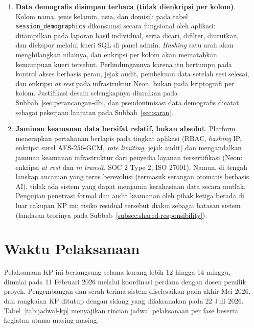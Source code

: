 \begin{enumerate}[leftmargin=2cm]
  \item \textbf{Data demografis disimpan terbaca (tidak dienkripsi per kolom)}. Kolom nama, jenis kelamin, usia, dan domisili pada tabel \texttt{session\_demographics} dikonsumsi secara fungsional oleh aplikasi: ditampilkan pada laporan hasil individual, serta dicari, difilter, diurutkan, dan diekspor melalui kueri SQL di panel admin. \textit{Hashing} satu arah akan menghilangkan nilainya, dan enkripsi per kolom akan mematahkan kemampuan kueri tersebut. Perlindungannya karena itu bertumpu pada kontrol akses berbasis peran, jejak audit, pembekuan data setelah sesi selesai, dan enkripsi \textit{at rest} pada infrastruktur Neon, bukan pada kriptografi per kolom. Justifikasi desain selengkapnya diuraikan pada Subbab~\ref{sec:perancangan-db}, dan pseudonimisasi data demografis dicatat sebagai pekerjaan lanjutan pada Subbab~\ref{sec:saran}.
  \item \textbf{Jaminan keamanan data bersifat relatif, bukan absolut}. Platform menerapkan pertahanan berlapis pada tingkat aplikasi (RBAC, \textit{hashing} IP, enkripsi surel AES-256-GCM, \textit{rate limiting}, jejak audit) dan mengandalkan jaminan keamanan infrastruktur dari penyedia layanan tersertifikasi (Neon: enkripsi \textit{at rest} dan \textit{in transit}, SOC 2 Type 2, ISO 27001). Namun, di tengah lanskap ancaman yang terus berevolusi (termasuk serangan otomatis berbasis AI), tidak ada sistem yang dapat menjamin kerahasiaan data secara mutlak. Pengujian penetrasi formal dan audit keamanan oleh pihak ketiga berada di luar cakupan KP ini; risiko residual tersebut diakui sebagai batasan sistem (landasan teorinya pada Subbab~\ref{subsec:shared-responsibility}).
\end{enumerate}

\section{Waktu Pelaksanaan}
\label{sec:waktu-pelaksanaan}

Pelaksanaan KP ini berlangsung selama kurang lebih 12 hingga 14 minggu, dimulai pada 11 Februari 2026 melalui koordinasi perdana dengan dosen pemilik proyek. Pengembangan dan serah terima sistem diselesaikan pada akhir Mei 2026, dan rangkaian KP ditutup dengan sidang yang dilaksanakan pada 22 Juli 2026. Tabel~\ref{tab:jadwal-kp} menyajikan rincian jadwal pelaksanaan per fase beserta kegiatan utama masing-masing.

